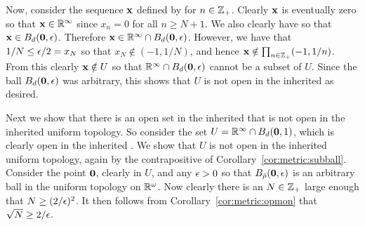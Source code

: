 {{    Now, consider the sequence $\mathbf{x}$ defined by
    for $n \in {{\mathbb{Z}}_+}$.
    Clearly $\mathbf{x}$ is eventually zero so that $\mathbf{x} \in {\mathbb{R}}^\infty$ since $x_n = 0$ for all $n \geq N+1$.
    We also clearly have
    so that $\mathbf{x} \in B_d(\mathbf{0}, \epsilon)$.
    Therefore $\mathbf{x} \in {\mathbb{R}}^\infty \cap B_d(\mathbf{0}, \epsilon)$.
    However, we have that $1/N \leq \epsilon/2 = x_N$ so that $x_N \notin (-1, 1/N)$, and hence $\mathbf{x} \notin \prod_{n \in {{\mathbb{Z}}_+}} (-1, 1/n)$.
    From this clearly $\mathbf{x} \notin U$ so that ${\mathbb{R}}^\infty \cap B_d(\mathbf{0}, \epsilon)$ cannot be a subset of $U$.
    Since the ball $B_d(\mathbf{0}, \epsilon)$ was arbitrary, this shows that $U$ is not open in the inherited \elltop{} as desired.

    Next we show that there is an open set in the inherited \elltop{} that is not open in the inherited uniform topology.
    So consider the set $U = {\mathbb{R}}^\infty \cap B_d(\mathbf{0}, 1)$, which is clearly open in the inherited \elltop{}.
    We show that $U$ is not open in the inherited uniform topology, again by the contrapositive of Corollary~\ref{cor:metric:subball}.
    Consider the point $\mathbf{0}$, clearly in $U$, and any $\epsilon > 0$ so that $B_{\bar{\rho}}(\mathbf{0}, \epsilon)$ is an arbitrary ball in the uniform topology on ${\mathbb{R}}^\omega$.
    Now clearly there is an $N \in {{\mathbb{Z}}_+}$ large enough that $N \geq (2/\epsilon)^2$.
    It then follows from Corollary~\ref{cor:metric:opmon} that $\sqrt{N} \geq 2/\epsilon$.

}}

